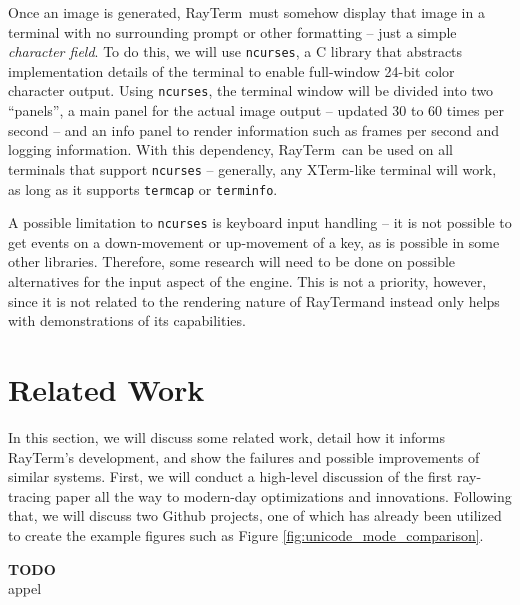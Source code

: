 \documentclass[11pt]{article}
\def\widow#1{\vskip #1\vbadness10000\penalty-200\vskip-#1}
\def\littlesection#1{
  \widow{2cm}
  \vskip 0.5cm
  \noindent{\bf #1}
  \vskip 0.0001cm
}
\newcommand{\name}{{\sc RayTerm}}
\newcommand\todo[1]{
\begin{center}
  \color{red}
  {\bf TODO}\\
  #1
\end{center}
}
\begin{document}
Once an image is generated, \name\ must somehow display that image in a terminal with no surrounding prompt or other formatting -- just a simple {\it character field}.
To do this, we will use \texttt{ncurses}, a C library that abstracts implementation details of the terminal to enable full-window 24-bit color character output.
Using \texttt{ncurses}, the terminal window will be divided into two ``panels'', a main panel for the actual image output -- updated 30 to 60 times per second -- and an info panel to render information such as frames per second and logging information.
With this dependency, \name\ can be used on all terminals that support \texttt{ncurses} -- generally, any XTerm-like terminal will work, as long as it supports \texttt{termcap} or \texttt{terminfo}.

A possible limitation to \texttt{ncurses} is keyboard input handling -- it is not possible to get events on a down-movement or up-movement of a key, as is possible in some other libraries.
Therefore, some research will need to be done on possible alternatives for the input aspect of the engine.
This is not a priority, however, since it is not related to the rendering nature of \name and instead only helps with demonstrations of its capabilities.

\section{Related Work}
\label{sec:relatedwork}


In this section, we will discuss some related work, detail how it informs \name's development, and show the failures and possible improvements of similar systems.
First, we will conduct a high-level discussion of the first ray-tracing paper all the way to modern-day optimizations and innovations.
Following that, we will discuss two Github projects, one of which has already been utilized to create the example figures such as Figure \ref{fig:unicode_mode_comparison}.


\littlesection{The First Ray-Tracer}

\todo{appel}
\end{document}
